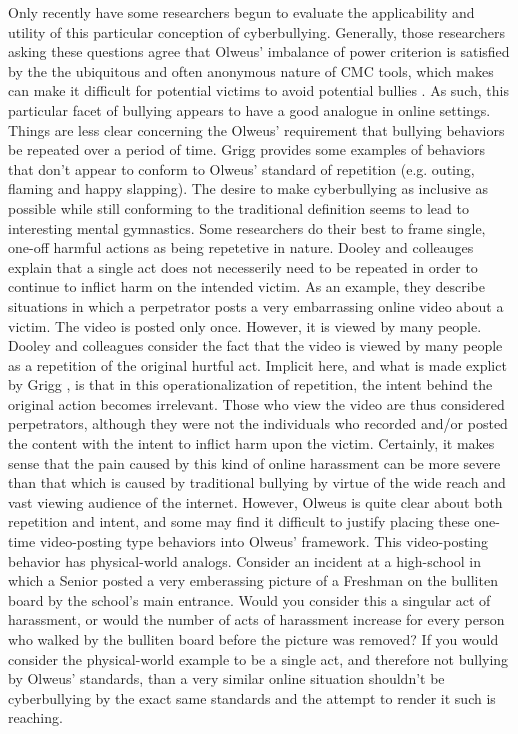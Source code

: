 \documentclass{sigchi}
\begin{document}
Only recently have some researchers begun to evaluate the applicability and utility of this particular conception of cyberbullying.  Generally, those researchers asking these questions agree that Olweus' imbalance of power criterion is satisfied by the the ubiquitous and often anonymous nature of CMC tools, which makes can make it difficult for potential victims to avoid potential bullies \cite{Grigg2010CyberAggression,Vandebosch2008Defining}.  As such, this particular facet of bullying appears to have a good analogue in online settings.  Things are less clear concerning the Olweus' requirement that bullying behaviors be repeated over a period of time.  Grigg \cite{Grigg2010CyberAggression} provides some examples of behaviors that don't appear to conform to Olweus' standard of repetition (e.g. outing, flaming and happy slapping\footnotemark[2]).  The desire to make cyberbullying as inclusive as possible while still conforming to the traditional definition seems to lead to interesting mental gymnastics.  Some researchers \cite{Dooley2009Cyberbullying,Grigg2010CyberAggression,Grigg2012Definitional} do their best to frame single, one-off harmful actions as being repetetive in nature.  Dooley and colleauges \cite{Dooley2009Cyberbullying} explain that a single act does not necesserily need to be repeated in order to continue to inflict harm on the intended victim.  As an example, they describe situations in which a perpetrator posts a very embarrassing online video about a victim.  The video is posted only once.  However, it is viewed by many people.  Dooley and colleagues consider the fact that the video is viewed by many people as a repetition of the original hurtful act.  Implicit here, and what is made explict by Grigg \cite{Grigg2012Definitional}, is that in this operationalization of repetition, the intent behind the original action becomes irrelevant.  Those who view the video are thus considered perpetrators, although they were not the individuals who recorded and/or posted the content with the intent to inflict harm upon the victim.  Certainly, it makes sense that the pain caused by this kind of online harassment can be more severe than that which is caused by traditional bullying by virtue of the wide reach and vast viewing audience of the internet.  However, Olweus \cite{Olweus1993Bullying} is quite clear about both repetition and intent, and some may find it difficult to justify placing these one-time video-posting type behaviors into Olweus' framework.  This video-posting behavior has physical-world analogs.  Consider an incident at a high-school in which a Senior posted a very emberassing picture of a Freshman on the bulliten board by the school's main entrance.  Would you consider this a singular act of harassment, or would the number of acts of harassment increase for every person who walked by the bulliten board before the picture was removed?  If you would consider the physical-world example to be a single act, and therefore not bullying by Olweus' standards, than a very similar online situation shouldn't be cyberbullying by the exact same standards and the attempt to render it such is reaching.  
\end{document}
